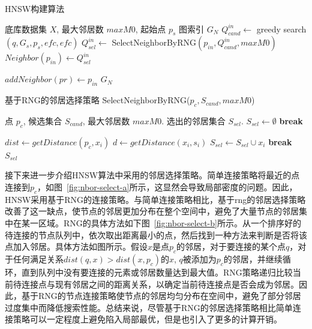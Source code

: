 \begin{algorithm}
    \caption{HNSW构建算法}
    \label{alg:construct} 
    \begin{algorithmic}[1]
        \REQUIRE
        底库数据集 $X$, 最大邻居数 $maxM0$, 起始点 $p_s$
        \ENSURE
        图索引 $G_N$
        \STATE $Q_{cand}^{in} \gets$ greedy search$(q,G_s,p_s,efc,efc)$
        \STATE $Q_{sel}^{in} \gets$ SelectNeighborByRNG$(p_{in},Q_{cand}^{in},maxM0)$
        \STATE $Neighbor(p_{in}) \gets Q_{sel}^{in}$
        
        \STATE $addNeighbor(pr) \gets p_{in}$
        \ENDFOR
        \ENDFOR
        \RETURN $G_N$
    \end{algorithmic} 
\end{algorithm}

\begin{algorithm}
    \caption{基于RNG的邻居选择策略 SelectNeighborByRNG($p_c,S_{cand},maxM0$)}
    \label{alg:RNG}
    \begin{algorithmic}[1]
        \REQUIRE
        点 $p_c$, 候选集合 $S_{cand}$, 最大邻居数 $maxM0$.
        \ENSURE
        选出的邻居集合 $S_{sel}$.
        \STATE $S_{sel} \gets \emptyset$
        \STATE \textbf{break}
        \ENDIF
        
        \STATE $dist \gets getDistance(p_c, x_i)$
        \STATE $d \gets getDistance(x_i, s_i)$
        \STATE $S_{sel} \gets S_{sel} \cup x_i$
        \ELSE
        \STATE \textbf{break}
        \ENDIF
        \ENDFOR
        \ENDFOR
        \RETURN $S_{sel}$
    \end{algorithmic} 
\end{algorithm}

接下来进一步介绍HNSW算法中采用的邻居选择策略。简单连接策略将最近的点连接到$p_c$，如图~\ref{fig:nbor-select-a}所示，这显然会导致局部密度的问题。因此，HNSW采用基于RNG的连接策略。与简单连接策略相比，基于rng的邻居选择策略改善了这一缺点，使节点的邻居更加分布在整个空间中，避免了大量节点的邻居集中在某一区域。RNG的具体方法如下图~\ref{fig:nbor-select-b}所示。从一个排序好的待连接的节点队列中，依次取出距离最小的点，然后找到一种方法来判断是否将该点加入邻居。具体方法如图所示。假设$x$是点$p_c$的邻居，对于要连接的某个点$q$，对于任何满足关系$dist(q,x)>dist(x,p_c)$的$x$, $q$被添加为$p_c$的邻居，并继续循环，直到队列中没有要连接的元素或邻居数量达到最大值。RNG策略递归比较当前待连接点与现有邻居之间的距离关系，以确定当前待连接点是否会成为邻居。因此，基于RNG的节点连接策略使节点的邻居均匀分布在空间中，避免了部分邻居过度集中而降低搜索性能。总结来说，尽管基于RNG的邻居选择策略相比简单连接策略可以一定程度上避免陷入局部最优，但是也引入了更多的计算开销。


